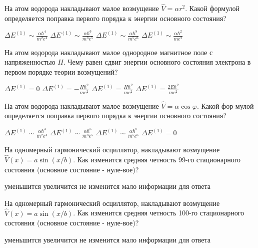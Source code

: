 \documentclass[11pt,a4paper]{exam}
\begin{document}
\begin{questions}
\question На атом водорода накладывают малое возмущение $\hat V = \alpha {r^2}$. Какой формулой определяется поправка первого порядка к энергии основного состояния?
\begin{choices}
\choice $\Delta {E^{(1)}} \sim \frac{{\alpha {\hbar ^4}}}{{{m^2}{e^4}}}$  
\choice $\Delta {E^{(1)}} \sim \frac{{\alpha {\hbar ^6}}}{{{m^3}{e^5}}}$  
\choice $\Delta {E^{(1)}} \sim \frac{{\alpha {\hbar ^8}}}{{{m^5}{e^6}}}$  
\choice $\Delta {E^{(1)}} \sim \frac{{\alpha {\hbar ^2}}}{{m{e^2}}}$
\end{choices}

\question На атом водорода накладывают малое однородное магнитное поле с напряженностью $H$. Чему равен сдвиг энергии основного состояния электрона в первом порядке теории возмущений?
\begin{choices}
\choice $\Delta {E^{(1)}} = 0$     
\choice $\Delta {E^{(1)}} =  - \frac{{H{\hbar ^2}}}{{m{e^2}}}$   
\choice $\Delta {E^{(1)}} = \frac{{H{\hbar ^2}}}{{m{e^2}}}$   
\choice $\Delta {E^{(1)}} = \frac{{2E{\hbar ^2}}}{{m{e^2}}}$
\end{choices}

\question На атом водорода накладывают малое возмущение $\hat V = \alpha \cos \varphi $. Какой фор-мулой определяется поправка первого порядка к энергии основного состояния?
\begin{choices}
\choice $\Delta {E^{(1)}} \sim \frac{{\alpha {\hbar ^4}}}{{{m^2}{e^4}}}$  
\choice $\Delta {E^{(1)}} \sim \frac{{\alpha {\hbar ^6}}}{{{m^3}{e^5}}}$  
\choice $\Delta {E^{(1)}} \sim \frac{{\alpha {\hbar ^8}}}{{{m^5}{e^6}}}$  
\choice $\Delta {E^{(1)}} = 0$
\end{choices}

\question На одномерный гармонический осциллятор, накладывают возмущение $\hat V(x) = a\sin (x/b)$. Как изменится средняя четность 99-го стационарного состояния (основное состояние - нуле-вое)?
\begin{choices}
\choice уменьшится  
\choice увеличится     
\choice не изменится   
\choice мало информации для ответа
\end{choices}

\question На одномерный гармонический осциллятор, накладывают возмущение $\hat V(x) = a\sin (x/b)$. Как изменится средняя четность 100-го стационарного состояния (основное состояние - нуле-вое)?
\begin{choices}
\choice уменьшится  
\choice увеличится     
\choice не изменится   
\choice мало информации для ответа
\end{choices}


\end{questions}
\end{document}
